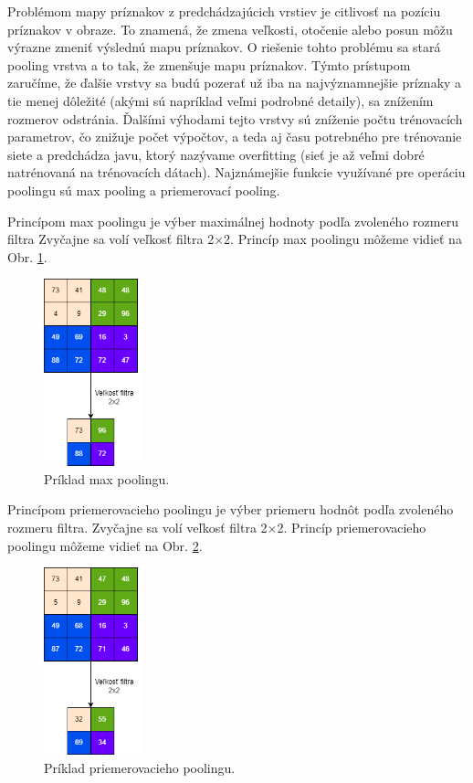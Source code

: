 Problémom mapy príznakov z predchádzajúcich vrstiev je citlivosť na pozíciu príznakov
v obraze. To znamená, že zmena veľkosti, otočenie alebo posun môžu výrazne zmeniť
výslednú mapu príznakov. O riešenie tohto problému sa stará pooling vrstva a to tak, že
zmenšuje mapu príznakov. Týmto prístupom zaručíme, že ďalšie vrstvy sa budú pozerať už iba na najvýznamnejšie príznaky a tie menej dôležité (akými sú napríklad veľmi podrobné detaily), sa znížením rozmerov odstránia. Ďalšími výhodami tejto vrstvy sú
zníženie počtu trénovacích parametrov, čo znižuje počet výpočtov, a teda aj času potrebného pre trénovanie siete a predchádza javu, ktorý nazývame overfitting (sieť je až veľmi dobré natrénovaná na trénovacích dátach). Najznámejšie funkcie využívané pre
operáciu poolingu sú max pooling a priemerovací pooling.

Princípom max poolingu je výber maximálnej hodnoty podľa zvoleného rozmeru
filtra Zvyčajne sa volí veľkosť filtra 2×2. Princíp max poolingu môžeme vidieť
na Obr. \ref{fig:max_pooling}.

\begin{figure}[H]
\centerline{\includegraphics[width=0.25\textwidth]{images/max pool.drawio.png}}
\caption{Príklad max poolingu.}
\label{fig:max_pooling}
\end{figure}

Princípom priemerovacieho poolingu je výber priemeru hodnôt podľa zvoleného rozmeru filtra. Zvyčajne sa volí veľkosť filtra 2×2. Princíp priemerovacieho poolingu môžeme vidieť na Obr. \ref{fig:avg_pooling}.

\begin{figure}[H]
\centerline{\includegraphics[width=0.25\textwidth]{images/avgpool.drawio.png}}
\caption{Príklad priemerovacieho poolingu.}
\label{fig:avg_pooling}
\end{figure}

